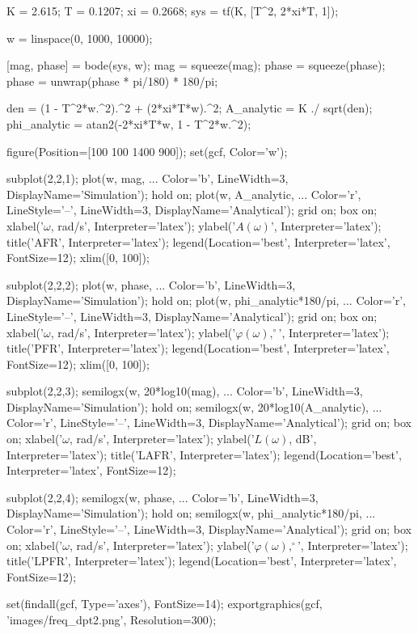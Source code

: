 \begin{matlabcode}
K = 2.615;
T = 0.1207;
xi = 0.2668;
sys = tf(K, [T^2, 2*xi*T, 1]);

w = linspace(0, 1000, 10000);

[mag, phase] = bode(sys, w);
mag = squeeze(mag); phase = squeeze(phase);
phase = unwrap(phase * pi/180) * 180/pi;

den = (1 - T^2*w.^2).^2 + (2*xi*T*w).^2;
A_analytic = K ./ sqrt(den);
phi_analytic = atan2(-2*xi*T*w, 1 - T^2*w.^2);

figure(Position=[100 100 1400 900]);
set(gcf, Color='w');

subplot(2,2,1);
plot(w, mag, ...
    Color='b', LineWidth=3, DisplayName='Simulation');
hold on;
plot(w, A_analytic, ...
    Color='r', LineStyle='--', LineWidth=3, DisplayName='Analytical');
grid on; box on;
xlabel('$\omega$, rad/s', Interpreter='latex');
ylabel('$A(\omega)$', Interpreter='latex');
title('AFR', Interpreter='latex');
legend(Location='best', Interpreter='latex', FontSize=12);
xlim([0, 100]);

subplot(2,2,2);
plot(w, phase, ...
    Color='b', LineWidth=3, DisplayName='Simulation');
hold on;
plot(w, phi_analytic*180/pi, ...
    Color='r', LineStyle='--', LineWidth=3, DisplayName='Analytical');
grid on; box on;
xlabel('$\omega$, rad/s', Interpreter='latex');
ylabel('$\varphi(\omega), ^\circ$', Interpreter='latex');
title('PFR', Interpreter='latex');
legend(Location='best', Interpreter='latex', FontSize=12);
xlim([0, 100]);

subplot(2,2,3);
semilogx(w, 20*log10(mag), ...
    Color='b', LineWidth=3, DisplayName='Simulation');
hold on;
semilogx(w, 20*log10(A_analytic), ...
    Color='r', LineStyle='--', LineWidth=3, DisplayName='Analytical');
grid on; box on;
xlabel('$\omega$, rad/s', Interpreter='latex');
ylabel('$L(\omega)$, dB', Interpreter='latex');
title('LAFR', Interpreter='latex');
legend(Location='best', Interpreter='latex', FontSize=12);

subplot(2,2,4);
semilogx(w, phase, ...
    Color='b', LineWidth=3, DisplayName='Simulation');
hold on;
semilogx(w, phi_analytic*180/pi, ...
    Color='r', LineStyle='--', LineWidth=3, DisplayName='Analytical');
grid on; box on;
xlabel('$\omega$, rad/s', Interpreter='latex');
ylabel('$\varphi(\omega), ^\circ$', Interpreter='latex');
title('LPFR', Interpreter='latex');
legend(Location='best', Interpreter='latex', FontSize=12);

set(findall(gcf, Type='axes'), FontSize=14);
exportgraphics(gcf, 'images/freq_dpt2.png', Resolution=300);
\end{matlabcode}


